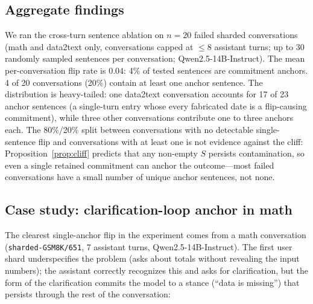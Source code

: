 \documentclass{article}
\begin{document}
\subsection{Aggregate findings}

We ran the cross-turn sentence ablation on $n{=}20$ failed sharded conversations (math and data2text only, conversations capped at $\leq 8$ assistant turns; up to 30 randomly sampled sentences per conversation; Qwen2.5-14B-Instruct). The mean per-conversation flip rate is $0.04$: 4\% of tested sentences are commitment anchors. 4 of 20 conversations (20\%) contain at least one anchor sentence. The distribution is heavy-tailed: one data2text conversation accounts for 17 of 23 anchor sentences (a single-turn entry whose every fabricated date is a flip-causing commitment), while three other conversations contribute one to three anchors each. The 80\%/20\% split between conversations with no detectable single-sentence flip and conversations with at least one is not evidence against the cliff: Proposition~\ref{prop:cliff} predicts that any non-empty $S$ persists contamination, so even a single retained commitment can anchor the outcome---most failed conversations have a small number of unique anchor sentences, not none.

\subsection{Case study: clarification-loop anchor in math}

The clearest single-anchor flip in the experiment comes from a math conversation (\texttt{sharded-GSM8K/651}, 7 assistant turns, Qwen2.5-14B-Instruct). The first user shard underspecifies the problem (asks about totals without revealing the input numbers); the assistant correctly recognizes this and asks for clarification, but the form of the clarification commits the model to a stance (``data is missing'') that persists through the rest of the conversation:
\end{document}
